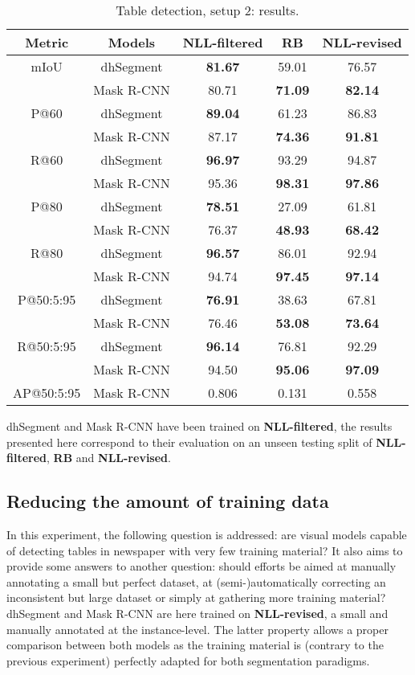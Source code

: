 \begin{table}[htp]
\begin{center}
\begin{tabular}{cc|c|c|c}
Metric & Models & NLL-filtered & RB & NLL-revised \\
\hline
mIoU & dhSegment & \textbf{81.67} & 59.01 & 76.57 \\
 & Mask R-CNN & 80.71 & \textbf{71.09} & \textbf{82.14}\\
 \hline
P@60 & dhSegment & \textbf{89.04} & 61.23 & 86.83\\
 & Mask R-CNN & 87.17 & \textbf{74.36} & \textbf{91.81}\\
  \hline
R@60 & dhSegment & \textbf{96.97} & 93.29 & 94.87\\
 & Mask R-CNN & 95.36 & \textbf{98.31} & \textbf{97.86}\\
  \hline
P@80 & dhSegment & \textbf{78.51} & 27.09 & 61.81\\
 & Mask R-CNN & 76.37 & \textbf{48.93} & \textbf{68.42}\\
 \hline
R@80 & dhSegment & \textbf{96.57} & 86.01 & 92.94\\
 & Mask R-CNN & 94.74 & \textbf{97.45} & \textbf{97.14}\\
 \hline
P@50:5:95 & dhSegment & \textbf{76.91} & 38.63 & 67.81\\
 & Mask R-CNN & 76.46 & \textbf{53.08} & \textbf{73.64}\\
 \hline
R@50:5:95 & dhSegment & \textbf{96.14} & 76.81 & 92.29\\
 & Mask R-CNN & 94.50 & \textbf{95.06} & \textbf{97.09}\\
 \hline
  \hline
 AP@50:5:95 & Mask R-CNN & 0.806 & 0.131 & 0.558\\
  \hline
\end{tabular}
\end{center}
\caption{Table detection, setup 2: results.}
\medskip
\small
dhSegment and Mask R-CNN have been trained on \textbf{NLL-filtered}, the results presented here correspond to their evaluation on an unseen testing split of \textbf{NLL-filtered}, \textbf{RB} and \textbf{NLL-revised}.
\label{setup2_results}
\end{table}%

\subsection{Reducing the amount of training data}
\label{table_detection_experiment2}
In this experiment, the following question is addressed: are visual models capable of detecting tables in newspaper with very few training material? It also aims to provide some answers to another question: should efforts be aimed at manually annotating a small but perfect dataset, at (semi-)automatically correcting an inconsistent but large dataset or simply at gathering more training material? \\
dhSegment and Mask R-CNN are here trained on \textbf{NLL-revised}, a small and manually annotated at the instance-level. The latter property allows a proper comparison between both models as the training material is (contrary to the previous experiment) perfectly adapted for both segmentation paradigms.

